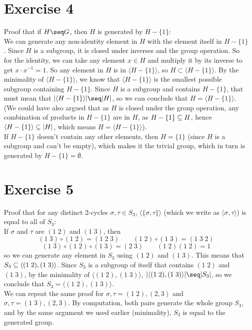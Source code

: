 \documentclass[12pt]{article}
\begin{document}
    \section*{Exercise 4}
    Proof that if $H \seq G$, then $H$ is generated by $H - \{1\}$: \\
    We can generate any non-identity element in $H$
    with the element itself in $H -\{1\}$.
    Since $H$ is a subgroup, it is closed under inverses and the group
    operation.
    So for the identity, we can take any element $x \in H$
    and multiply it by its inverse to get $x \cdot x^{-1} = 1$.
    So any element in $H$ is in $\langle H - \{1\} \rangle$,
    so $H \subset \langle H - \{1\} \rangle$.
    By the minimality of $\langle H - \{1\} \rangle$,
    we know that $\langle H - \{1\} \rangle$ is the smallest
    possible subgroup containing $H - \{1\}$.
    Since $H$ is a subgroup and contains $H - \{1\}$,
    that must mean that $|\langle H - \{1\} \rangle| \seq |H|$,
    so we can conclude that $H = \langle H - \{1\} \rangle$.
    (We could have also argued that as $H$ is closed under the group
    operation,
    any combination of products in $H - \{1\}$ are in $H$,
    as $H -\{1\} \subseteq H$,
    hence $\langle H - \{1\} \rangle \subseteq |H|$,
    which means $H = \langle H - \{1\} \rangle$). \\
    If $H - \{1\}$ doesn't contain any other elements,
    then $H = \{1\}$ (since $H$ is a subgroup and can't be empty),
    which makes it the trivial group,
    which in turn is generated by $H - \{1\} = \emptyset$.


    \section*{Exercise 5}
    Proof that for any distinct 2-cycles $\sigma, \tau \in S_3$,
    $\langle \{\sigma, \tau\} \rangle$ 
    (which we write as $\langle \sigma, \tau \rangle$)
    is equal to all of $S_3$: \\
    If $\sigma$ and $\tau$ are $(1\;2)$ and $(1\;3)$,
    then 
    \[(1\;3) \circ (1\;2) = (1\;2\;3) \qquad
    (1\;2) \circ (1\;3) = (1\;3\;2) \]
    \[ (1\;3) \circ (1\;2) \circ (1\;3) = (2\;3) \qquad
    (1\;2)(1\;2) = 1\]
    so we can generate any element in $S_3$ using $(1\;2)$ and $(1\;3)$.
    This means that $S_3 \subseteq \langle (1\;2), (1\;3) \rangle$.
    Since $S_3$ is a subgroup of itself
    that contains $(1\;2)$ and $(1\;3)$,
    by the minimality of $\langle (1\;2), (1\;3) \rangle$,
    $|\langle (1\;2), (1\;3) \rangle| \seq |S_3|$,
    so we conclude that $S_3 = \langle (1\;2), (1\;3) \rangle$. \\
    We can repeat the same proof for $\sigma, \tau = (1\;2), (2, 3)$
    and $\sigma, \tau = (1\;3), (2, 3)$.
    By computation, both pairs generate the whole group $S_3$,
    and by the same argument we used earlier (minimality),
    $S_3$ is equal to the generated group.
\end{document}
